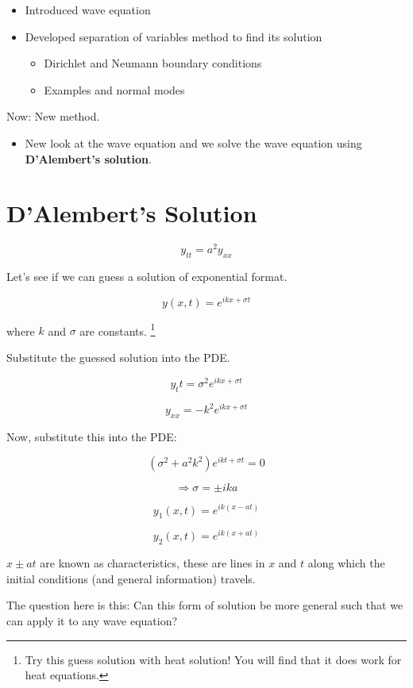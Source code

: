 \begin{itemize}
    \item Introduced wave equation
    \item Developed separation of variables method to find its solution
    \begin{itemize}
        \item Dirichlet and Neumann boundary conditions
        \item Examples and normal modes
    \end{itemize}
\end{itemize}

Now: New method. 

\begin{itemize}
    \item New look at the wave equation and we solve the wave equation using \textbf{D'Alembert's solution}. 
\end{itemize}

\section{D'Alembert's Solution}

$$y_{tt} = a^2 y_{xx}$$

Let's see if we can guess a solution of exponential format. 

$$y(x,t) = e^{i k x + \sigma t}$$

where $k$ and $\sigma$ are constants. \footnote{Try this guess solution with heat solution! You will find that it does work for heat equations. }

Substitute the guessed solution into the PDE. 

$$y_tt = \sigma^2 e^{i k x + \sigma t}$$

$$y_{xx} = - k^2 e^{i k x + \sigma t}$$

Now, substitute this into the PDE:

$$\left(\sigma^2 + a^2 k^2 \right) e^{i k t + \sigma t} = 0$$

$$\Rightarrow \sigma = \pm i k a$$

$$y_1 (x,t) = e^{i k (x - at)}$$

$$y_2(x,t) = e^{i k(x + at)}$$

$x \pm at$ are known as characteristics, these are lines in $x$ and $t$ along which the initial conditions (and general information) travels. 

The question here is this: Can this form of solution be more general such that we can apply it to any wave equation?

